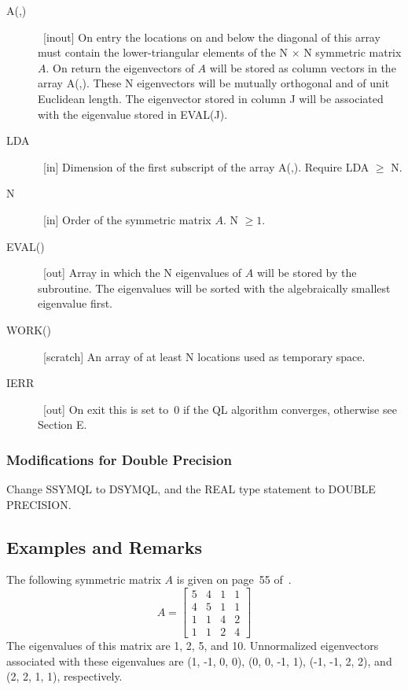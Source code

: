 \documentclass[twoside]{MATH77}
\begin{document}
\begin{description}
\item[A(,)]  \ [inout] On entry the locations on and below the diagonal of
this array must contain the lower-triangular elements of the N $\times $ N
symmetric matrix $A$. On return the eigenvectors of $A$ will be stored as
column vectors in the array A(,). These N eigenvectors will be mutually
orthogonal and of unit Euclidean length. The eigenvector stored in column
J will be associated with the eigenvalue stored in EVAL(J).

\item[LDA]  \ [in] Dimension of the first subscript of the array A(,). Require
LDA $\geq $ N.

\item[N]  \ [in] Order of the symmetric matrix $A$. N $\geq 1.$

\item[EVAL()]  \ [out] Array in which the N eigenvalues of $A$ will be stored
by the subroutine. The eigenvalues will be sorted with the algebraically
smallest eigenvalue first.

\item[WORK()]  \ [scratch] An array of at least N locations used as
temporary space.

\item[IERR]  \ [out] On exit this is set to~0 if the QL algorithm converges,
otherwise see Section E.
\end{description}

\subsubsection{Modifications for Double Precision}

Change SSYMQL to DSYMQL, and the REAL type statement to DOUBLE PRECISION.

\subsection{Examples and Remarks}

The following symmetric matrix $A$ is
given on page~55 of~\cite{Gregory:1969:ACM}.
\begin{equation*}
A=\left[
\begin{array}{rrrr}
5 & 4 & 1 & 1 \\
4 & 5 & 1 & 1 \\
1 & 1 & 4 & 2 \\
1 & 1 & 2 & 4
\end{array}
\right]
\end{equation*}
The eigenvalues of this matrix are 1, 2, 5, and 10. Unnormalized
eigenvectors associated with these eigenvalues are (1, -1, 0, 0),
(0, 0, -1, 1), (-1, -1, 2, 2), and (2, 2, 1, 1), respectively.
\end{document}
